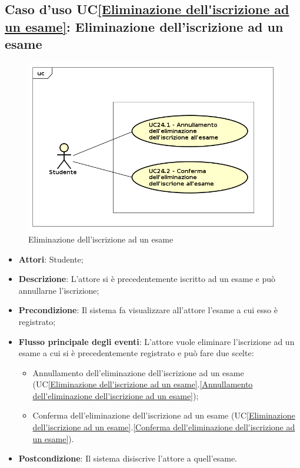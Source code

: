 \subsection{Caso d'uso UC\ref{Eliminazione dell'iscrizione ad un esame}: Eliminazione dell'iscrizione ad un esame}
\begin{figure} [H]
	\centering
	\includegraphics[scale=0.45]{./img/UseCaseDiagram024.png}
	\caption{Eliminazione dell'iscrizione ad un esame}\label{}
\end{figure}
\begin{itemize}
	\item \textbf{Attori}: Studente;
	\item \textbf{Descrizione}: L'attore si è precedentemente iscritto ad un esame e può annullarne l'iscrizione;
	\item \textbf{Precondizione}: Il sistema fa visualizzare all'attore l'esame a cui esso è registrato;
	\item \textbf{Flusso principale degli eventi}: L'attore vuole eliminare l'iscrizione ad un esame a cui si è precedentemente registrato e può fare due scelte:
	\begin{itemize}
		\item Annullamento dell'eliminazione dell'iscrizione ad un esame (UC\ref{Eliminazione dell'iscrizione ad un esame}.\ref{Annullamento dell'eliminazione dell'iscrizione ad un esame});
		\item Conferma dell'eliminazione dell'iscrizione ad un esame (UC\ref{Eliminazione dell'iscrizione ad un esame}.\ref{Conferma dell'eliminazione dell'iscrizione ad un esame}).
	\end{itemize}
	\item \textbf{Postcondizione}: Il sistema disiscrive l'attore a quell'esame.
\end{itemize}

